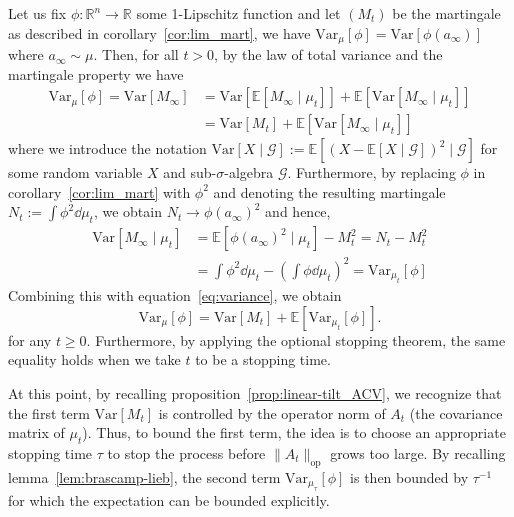 Let us fix \(\phi : \mathbb{R}^n \to \mathbb{R}\) some 1-Lipschitz function and let \((M_t)\) be the 
martingale as described in corollary~\ref{cor:lim_mart}, we have \(\text{Var}_\mu[\phi] = \text{Var}[\phi(a_\infty)]\) 
where \(a_\infty \sim \mu\).
Then, for all \(t > 0\), by the law of total variance and the martingale property we have
\begin{equation}\label{eq:variance}
  \begin{split}
    \text{Var}_\mu[\phi] = \text{Var}[M_\infty] & = \text{Var}[\mathbb{E}[M_\infty \mid \mu_t]] + \mathbb{E}[\text{Var}[M_\infty \mid \mu_t]]\\
    & = \text{Var}[M_t] + \mathbb{E}[\text{Var}[M_\infty \mid \mu_t]]
  \end{split}
\end{equation}
where we introduce the notation \(\text{Var}[X \mid \mathcal{G}] := \mathbb{E}[(X - \mathbb{E}[X \mid \mathcal{G}])^2 \mid \mathcal{G}]\)
for some random variable \(X\) and sub-\(\sigma\)-algebra \(\mathcal{G}\). Furthermore, by replacing 
\(\phi\) in corollary~\ref{cor:lim_mart} with \(\phi^2\) and denoting the resulting martingale 
\(N_t := \int \phi^2 \dd \mu_t\), we obtain \(N_t \to \phi(a_\infty)^2\) and hence,
\begin{align*}
  \text{Var}[M_\infty \mid \mu_t] & = \mathbb{E}[\phi(a_\infty)^2 \mid \mu_t] - M_t^2 = N_t - M_t^2\\ 
    & = \int \phi^2 \dd \mu_t - \left(\int \phi \dd \mu_t\right)^2 = \text{Var}_{\mu_t}[\phi]
\end{align*}
Combining this with equation~\eqref{eq:variance}, we obtain
\begin{equation}\label{eq:bound}
  \text{Var}_\mu[\phi] = \text{Var}[M_t] + \mathbb{E}[\text{Var}_{\mu_t}[\phi]].
\end{equation}
for any \(t \ge 0\). Furthermore, by applying the optional stopping theorem, the same equality holds 
when we take \(t\) to be a stopping time. 

At this point, by recalling proposition~\ref{prop:linear-tilt_ACV}, we recognize that the first term 
\(\text{Var}[M_t]\) is controlled by the operator norm of \(A_t\) (the covariance matrix of \(\mu_t\)).
Thus, to bound the first term, the idea is to choose an appropriate stopping time \(\tau\) to 
stop the process before \(\|A_t\|_\text{op}\) grows too large. By recalling lemma~\ref{lem:brascamp-lieb},
the second term \(\text{Var}_{\mu_\tau}[\phi]\) is then bounded by \(\tau^{-1}\) for which the
expectation can be bounded explicitly.

